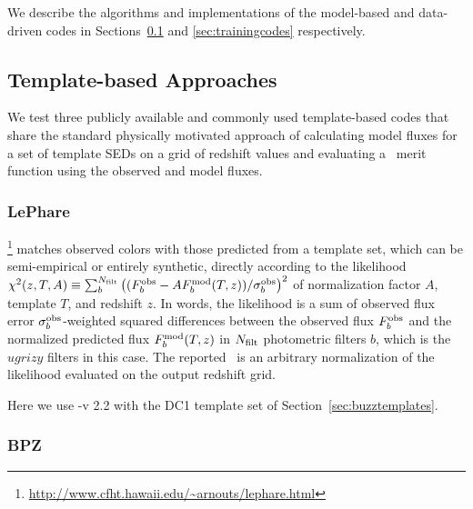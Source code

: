 We describe the algorithms and implementations of the model-based and data-driven codes in Sections~\ref{sec:templatecodes} and \ref{sec:trainingcodes} respectively.

\subsection{Template-based Approaches}
\label{sec:templatecodes}

We test three publicly available and commonly used template-based codes that share the standard physically motivated approach of calculating model fluxes for a set of template SEDs on a grid of redshift values and evaluating a \chisq\ merit function using the observed and model fluxes.

\subsubsection{LePhare}
\label{sec:lephare}

\lephare \footnote{\url{http://www.cfht.hawaii.edu/~arnouts/lephare.html}}\citep[Photometric Analysis for Redshift Estimate,][]{Arnouts:99,Ilbert:06} matches observed colors with those predicted from a template set, which can be semi-empirical or entirely synthetic, directly according to the likelihood $\chi^{2}(z, T, A) \equiv \sum_{b}^{N_{\rm{filt}}} \left((F^{\rm{obs}}_{b} - A F^{\rm{mod}}_{b}(T, z)) / \sigma^{\rm{obs}}_{b}\right)^{2}$ of normalization factor $A$, template $T$, and redshift $z$.
In words, the likelihood is a sum of observed flux error $\sigma_{b}^{\rm{obs}}$-weighted squared differences between the observed flux $F^{\rm{obs}}_{b}$ and the normalized predicted flux $F^{\rm{mod}}_{b}(T, z)$ in $N_{\rm{filt}}$ photometric filters $b$, which is the \lsst\ $ugrizy$ filters in this case.
The reported \pzpdf\ is an arbitrary normalization of the likelihood evaluated on the output redshift grid.

Here we use \lephare-v 2.2 with the DC1 template set of Section~\ref{sec:buzztemplates}.

\subsubsection{BPZ}
\label{sec:BPZ}

